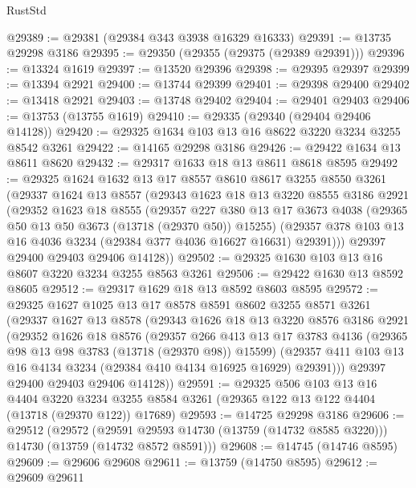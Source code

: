 \begin{lexlean}{RustStd}
\begin{coremodule}
@29389 := @29381 (@29384 @343 @3938 @16329 @16333)
@29391 := @13735 @29298 @3186
@29395 := @29350 (@29355 (@29375 (@29389 @29391)))
@29396 := @13324 @1619
@29397 := @13520 @29396
@29398 := @29395 @29397
@29399 := @13394 @2921
@29400 := @13744 @29399
@29401 := @29398 @29400
@29402 := @13418 @2921
@29403 := @13748 @29402
@29404 := @29401 @29403
@29406 := @13753 (@13755 @1619)
@29410 := @29335 (@29340 (@29404 @29406 @14128))
@29420 := @29325 @1634 @103 @13 @16 @8622 @3220 @3234 @3255 @8542 @3261
@29422 := @14165 @29298 @3186
@29426 := @29422 @1634 @13 @8611 @8620
@29432 := @29317 @1633 @18 @13 @8611 @8618 @8595
@29492 := @29325
    @1624
    @1632
    @13
    @17
    @8557
    @8610
    @8617
    @3255
    @8550
    @3261
    (@29337
      @1624
      @13
      @8557
      (@29343
        @1623
        @18
        @13
        @3220
        @8555
        @3186
        @2921
        (@29352
          @1623
          @18
          @8555
          (@29357
            @227
            @380
            @13
            @17
            @3673
            @4038
            (@29365 @50 @13 @50 @3673 (@13718 (@29370 @50)) @15255)
            (@29357 @378 @103 @13 @16 @4036 @3234 (@29384 @377 @4036 @16627 @16631) @29391)))
        @29397
        @29400
        @29403
        @29406
        @14128))
@29502 := @29325 @1630 @103 @13 @16 @8607 @3220 @3234 @3255 @8563 @3261
@29506 := @29422 @1630 @13 @8592 @8605
@29512 := @29317 @1629 @18 @13 @8592 @8603 @8595
@29572 := @29325
    @1627
    @1025
    @13
    @17
    @8578
    @8591
    @8602
    @3255
    @8571
    @3261
    (@29337
      @1627
      @13
      @8578
      (@29343
        @1626
        @18
        @13
        @3220
        @8576
        @3186
        @2921
        (@29352
          @1626
          @18
          @8576
          (@29357
            @266
            @413
            @13
            @17
            @3783
            @4136
            (@29365 @98 @13 @98 @3783 (@13718 (@29370 @98)) @15599)
            (@29357 @411 @103 @13 @16 @4134 @3234 (@29384 @410 @4134 @16925 @16929) @29391)))
        @29397
        @29400
        @29403
        @29406
        @14128))
@29591 := @29325
    @506
    @103
    @13
    @16
    @4404
    @3220
    @3234
    @3255
    @8584
    @3261
    (@29365 @122 @13 @122 @4404 (@13718 (@29370 @122)) @17689)
@29593 := @14725 @29298 @3186
@29606 := @29512
    (@29572
      (@29591 @29593 @14730 (@13759 (@14732 @8585 @3220)))
      @14730
      (@13759 (@14732 @8572 @8591)))
@29608 := @14745 (@14746 @8595)
@29609 := @29606 @29608
@29611 := @13759 (@14750 @8595)
@29612 := @29609 @29611

\end{coremodule}
\end{lexlean}
